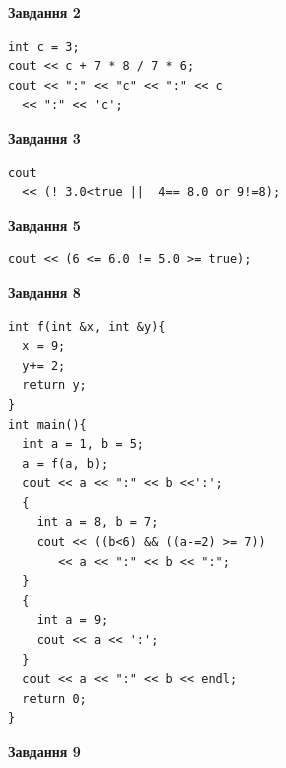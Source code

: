 \documentclass[12pt, ukrainian]{article}
\begin{document}
{\begin {large}
\begin{minipage}[t]{7.0cm}
\end{minipage}
\vline \hspace{1mm}
\begin{minipage}[t]{11.0cm}

\begin{center}
\textbf{Завдання 2}
\end{center}
\vspace{-8mm}

\begin{verbatim}
int c = 3;
cout << c + 7 * 8 / 7 * 6;
cout << ":" << "c" << ":" << c 
  << ":" << 'c';
\end{verbatim}



\begin{center}
\textbf{Завдання 3}
\end{center}
\vspace{-8mm}

\begin{verbatim}
cout 
  << (! 3.0<true ||  4== 8.0 or 9!=8);
\end{verbatim}



\begin{center}
\textbf{Завдання 5}
\end{center}
\vspace{-8mm}

\begin{verbatim}
cout << (6 <= 6.0 != 5.0 >= true);
\end{verbatim}



\begin{center}
\textbf{Завдання 8}
\end{center}
\vspace{-8mm}

\begin{verbatim}
int f(int &x, int &y){
  x = 9;
  y+= 2;
  return y;
}
int main(){
  int a = 1, b = 5;
  a = f(a, b);
  cout << a << ":" << b <<':';
  {
    int a = 8, b = 7;
    cout << ((b<6) && ((a-=2) >= 7))
       << a << ":" << b << ":";
  }
  {
    int a = 9;
    cout << a << ':';
  }
  cout << a << ":" << b << endl;
  return 0;
}
\end{verbatim}

\end{minipage}


\begin{minipage}[t]{7.0cm}

\begin{center}
\textbf{Завдання 9}
\end{center}
\vspace{-8mm}


\end{minipage}
\end{large}}
\end{document}

